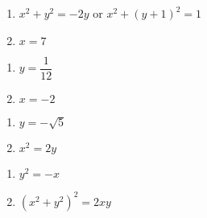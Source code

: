 \documentclass{ximera}
\begin{document}
\begin{multicols}{2}

\begin{enumerate}

\setcounter{enumi}{\value{HW}}

\item $x^2 + y^2 = -2y$ or $x^2+(y+1)^2 = 1$ 
\item  $x=7$  

\setcounter{HW}{\value{enumi}}

\end{enumerate}

\end{multicols}

\begin{multicols}{2}

\begin{enumerate}

\setcounter{enumi}{\value{HW}}

\item  $y = \dfrac{1}{12}$
\item  $x = -2$ 

\setcounter{HW}{\value{enumi}}

\end{enumerate}

\end{multicols}

\begin{multicols}{2}

\begin{enumerate}

\setcounter{enumi}{\value{HW}}

\item  $y= -\sqrt{5}$
\item  $x^2=2y$

\setcounter{HW}{\value{enumi}}

\end{enumerate}

\end{multicols}

\begin{multicols}{2}

\begin{enumerate}

\setcounter{enumi}{\value{HW}}

\item  $y^2=-x$
\item  $\left( x^{2} + y^{2} \right)^{2} = 2xy$

\setcounter{HW}{\value{enumi}}

\end{enumerate}

\end{multicols}
\end{document}
